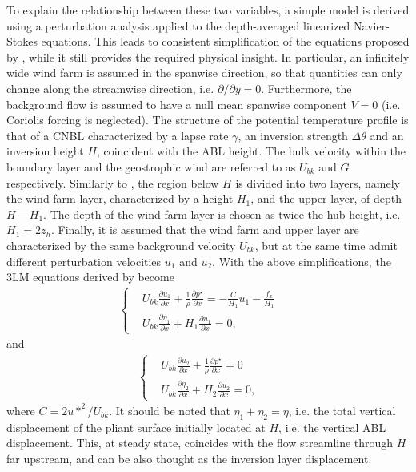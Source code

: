 To explain the relationship between these two variables, a simple model is derived using a perturbation analysis applied to the depth-averaged linearized Navier-Stokes equations. This leads to consistent simplification of the equations proposed by \cite{AllaertsMeyers2019}, while it still provides the required physical insight. In particular, an infinitely wide wind farm is assumed in the spanwise direction, so that quantities can only change along the streamwise direction, i.e. $\partial/\partial y = 0$. Furthermore, the background flow is assumed to have a null mean spanwise component $V=0$ (i.e. Coriolis forcing is neglected). The structure of the potential temperature profile is that of a CNBL characterized by a lapse rate $\gamma$, an inversion strength $\Delta\theta$ and an inversion height $H$, coincident with the ABL height. The bulk velocity within the boundary layer and the geostrophic wind are referred to as $U_{bk}$ and $G$ respectively. Similarly to \cite{AllaertsMeyers2019}, the region below $H$ is divided into two layers, namely the wind farm layer, characterized by a height $H_1$, and the upper layer, of depth $H-H_1$. The depth of the wind farm layer is chosen as twice the hub height, i.e. $H_1=2z_h$. Finally, it is assumed that the wind farm and upper layer are characterized by the same background velocity $U_{bk}$, but at the same time admit different perturbation velocities $u_1$ and $u_2$. With the above simplifications, the 3LM equations derived by \cite{AllaertsMeyers2019} become
\begin{align}
	\left\{
	\begin{alignedat}{2}
		&  U_{bk}\frac{\partial u_1}{\partial x}
		+ \frac{1}{\rho}\frac{\partial p^\star}{\partial x}
		=
		- \frac{C}{H_1}u_1 
		- \frac{f_x}{H_1}  \\	
		&  U_{bk}\frac{\partial \eta_1}{\partial x} 
		+ H_1\frac{\partial u_1}{\partial x} = 0, 
	\end{alignedat}
	\right. && \label{eq:3LM_Layer1_Simplified}
\end{align}
and
\begin{align}
	\left\{
	\begin{alignedat}{2}
		&  U_{bk}\frac{\partial u_2}{\partial x}
		+ \frac{1}{\rho}\frac{\partial p^\star}{\partial x}
		=
		0 \\	
		&  U_{bk} \frac{\partial \eta_2}{\partial x} 
		+ H_2\frac{\partial u_2}{\partial x} = 0, 
	\end{alignedat}
	\right. &&\label{eq:3LM_Layer2_Simplified}
\end{align}
where $C=2u*^{2}/U_{bk}$. It should be noted that $\eta_1+\eta_2 = \eta$, i.e. the total vertical displacement of the pliant surface initially located at $H$, i.e. the vertical ABL displacement. This, at steady state, coincides with the flow streamline through $H$ far upstream, and can be also thought as the inversion layer displacement. 


